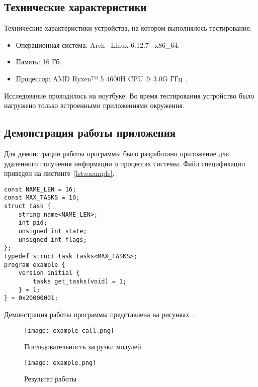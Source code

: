 
\vspace{-1\baselineskip}

\subsection{Технические характеристики}

Технические характеристики устройства, на котором выполнялось тестирование.

\begin{itemize}
    \item Операционная система: Arch~\cite{Arch} Linux 6.12.7~\cite{Linux} x86\_64.
    \item Память: 16 Гб.
    \item Процессор: AMD Ryzen™ 5 4600H CPU @ 3.0G ГГц~\cite{AMD_CPU}.
\end{itemize}

Исследование проводилось на ноутбуке. Во время тестирования
устройство было нагружено только встроенными приложениями окружения.

\subsection{Демонстрация работы приложения}

Для демонстрации работы программы было разработано приложение для удаленного
получения информации о процессах системы. Файл спецификации приведен на
листинге~\ref{lst:example}.

\begin{lstlisting}[caption={Файл спецификации примера}, label={lst:example}]
const NAME_LEN = 16;
const MAX_TASKS = 10;
struct task {
    string name<NAME_LEN>;
    int pid;
    unsigned int state;
    unsigned int flags;
};
typedef struct task tasks<MAX_TASKS>;
program example {
    version initial {
        tasks get_tasks(void) = 1;
    } = 1;
} = 0x20000001;
\end{lstlisting}

\clearpage

Демонстрация работы программы представлена на
рисунках~.

\begin{figure}[!h]
    \centering
    \texttt{[image: example\_call.png]}
    \caption{Последовательность загрузки модулей}
    \label{fig:example_call}
\end{figure}

\begin{figure}[!h]
    \centering
    \texttt{[image: example.png]}
    \caption{Результат работы}
    \label{fig:example}
\end{figure}

